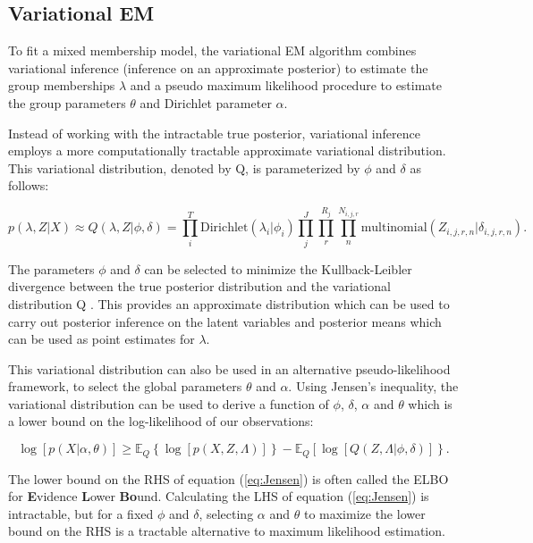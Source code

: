 \documentclass{article}
\newcommand{\E}{\mathbb{E}}
\begin{document}
\subsection{Variational EM}\label{VI}
To fit a mixed membership model, the variational EM algorithm combines variational inference (inference on an approximate posterior) to estimate the group memberships $\lambda$ and a pseudo maximum likelihood procedure to estimate the group parameters $\theta$ and Dirichlet parameter $\alpha$.

Instead of working with the intractable true posterior, variational inference employs a more computationally tractable approximate variational distribution. This variational distribution, denoted by Q, is parameterized by $\phi$ and $\delta$ as follows: 

\begin{equation} \label{eq:varDist}
p(\lambda, Z|X) \approx Q(\lambda,Z|\phi, \delta) = \prod_i^T \text{Dirichlet}(\lambda_i|\phi_i)\prod_j^J \prod_r^{R_j} \prod_n^{N_{i,j,r}}\text{multinomial}(Z_{i,j,r,n}|\delta_{i,j,r,n}).
\end{equation}

The parameters $\phi$ and $\delta$ can be selected to minimize the Kullback-Leibler divergence between the true posterior distribution and the variational distribution Q \citep{beal2003variational}. This provides an approximate distribution which can be used to carry out posterior inference on the latent variables and posterior means which can be used as point estimates for $\lambda$.

This variational distribution can also be used in an alternative pseudo-likelihood framework, to select the global parameters $\theta$ and $\alpha$. Using Jensen's inequality, the variational distribution can be used to derive a function of $\phi$, $\delta$, $\alpha$ and $\theta$ which is a lower bound on the log-likelihood of our observations:

\begin{equation}\label{eq:Jensen}
\log\left[p(X|\alpha, \theta)\right] \geq \E_Q\left\{\log\left[p(X,Z, \Lambda)\right]\right\} - \E_Q\left[\log\left[Q(Z, \Lambda|\phi, \delta)\right]\right\}.
\end{equation}

The lower bound on the RHS of equation (\ref{eq:Jensen}) is often called the ELBO for \textbf{E}vidence \textbf{L}ower \textbf{Bo}und. Calculating the LHS of equation (\ref{eq:Jensen}) is intractable, but for a fixed $\phi$ and $\delta$, selecting $\alpha$ and $\theta$ to maximize the lower bound on the RHS is a tractable alternative to maximum likelihood estimation. 
\end{document}
